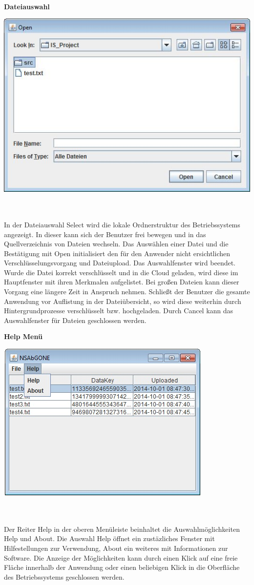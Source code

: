\documentclass[12pt,a4paper,bibliography=totocnumbered,listof=totocnumbered]{scrartcl}
\begin{document}
\textbf{Dateiauswahl}
\vspace{1em}
$\;$\\
\begin{minipage}{\linewidth}
	\centering
	\includegraphics[width=0.4\linewidth]{./img/Select.jpg}
	\label{Select}
\end{minipage}
\\\\In der Dateiauswahl Select wird die lokale Ordnerstruktur des Betriebssystems angezeigt. In dieser kann sich der Benutzer frei bewegen und in das Quellverzeichnis von Dateien wechseln. Das Auswählen einer Datei und die Bestätigung mit Open initialisiert den für den Anwender nicht ersichtlichen Verschlüsselungsvorgang und Dateiupload. Das Auswahlfenster wird beendet. Wurde die Datei korrekt verschlüsselt und in die Cloud geladen, wird diese im Hauptfenster mit ihren Merkmalen aufgelistet. Bei großen Dateien kann dieser Vorgang eine längere Zeit in Anspruch nehmen. Schließt der Benutzer die gesamte Anwendung vor Auflistung in der Dateiübersicht, so wird diese weiterhin durch Hintergrundprozesse verschlüsselt bzw. hochgeladen. Durch Cancel kann das Auswahlfenster für Dateien geschlossen werden.

\textbf{Help Menü}
\vspace{1em}
$\;$\\
\begin{minipage}{\linewidth}
	\centering
	\includegraphics[width=0.4\linewidth]{./img/Help.jpg}
	\label{Help}
\end{minipage}
\\\\Der Reiter Help in der oberen Menüleiste beinhaltet die Auswahlmöglichkeiten Help und About. Die Auswahl Help öffnet ein zustäzliches Fenster mit Hilfestellungen zur Verwendung, About ein weiteres mit Informationen zur Software. Die Anzeige der Möglichkeiten kann durch einen Klick auf eine freie Fläche innerhalb der Anwendung oder einen beliebigen Klick in die Oberfläche des Betriebssystems geschlossen werden.
\end{document}
